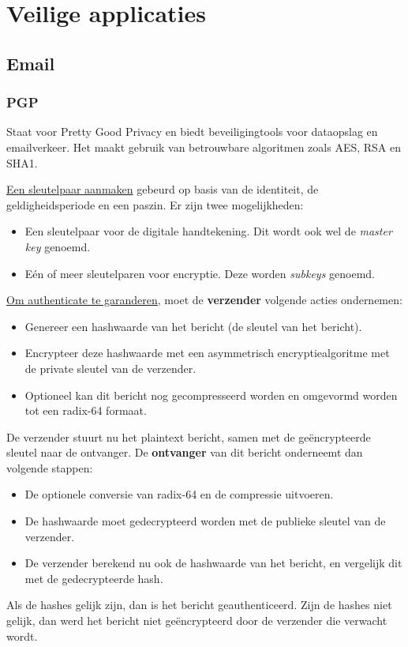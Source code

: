 \documentclass{report}
\begin{document}
	\section{Veilige applicaties}
	\subsection{Email}
	\subsubsection{PGP}
	Staat voor Pretty Good Privacy en biedt beveiligingtools voor dataopslag en emailverkeer. Het maakt gebruik van betrouwbare algoritmen zoals AES, RSA en SHA1.
	
	\underline{Een sleutelpaar aanmaken} gebeurd op basis van de identiteit, de geldigheidsperiode en een paszin. Er zijn twee mogelijkheden:
	\begin{itemize}
		\item[\info] Een sleutelpaar voor de digitale handtekening. Dit wordt ook wel de \emph{master key} genoemd. 
		\item[\info] Eén of meer sleutelparen voor encryptie. Deze worden \emph{subkeys} genoemd. 
	\end{itemize}

	\underline{Om authenticate te garanderen}, moet de \textbf{verzender} volgende acties ondernemen:
	\begin{itemize}
		\item[\info] Genereer een hashwaarde van het bericht (de sleutel van het bericht).
		\item[\info] Encrypteer deze hashwaarde met een asymmetrisch encryptiealgoritme met de private sleutel van de verzender.
		\item[\info] Optioneel kan dit bericht nog gecompresseerd worden en omgevormd worden tot een radix-64 formaat.
	\end{itemize}
	De verzender stuurt nu het plaintext bericht, samen met de geëncrypteerde sleutel naar de ontvanger. De \textbf{ontvanger} van dit bericht onderneemt dan volgende stappen:
	\begin{itemize}
		\item[\info] De optionele conversie van radix-64 en de compressie uitvoeren.
		\item[\info] De hashwaarde moet gedecrypteerd worden met de publieke sleutel van de verzender.
		\item[\info] De verzender berekend nu ook de hashwaarde van het bericht, en vergelijk dit met de gedecrypteerde hash. 
	\end{itemize}
	Als de hashes gelijk zijn, dan is het bericht geauthenticeerd. Zijn de hashes niet gelijk, dan werd het bericht niet geëncrypteerd door de verzender die verwacht wordt.
\end{document}
